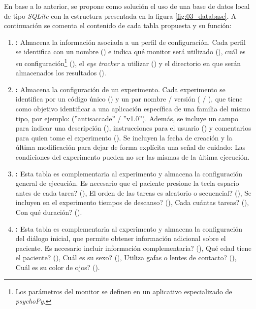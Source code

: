 \documentclass[\main/Main.tex]{subfiles}
\begin{document}
			En base a lo anterior, se propone como solución el uso de una base de datos local de tipo \textit{SQLite} con la estructura presentada en la figura \ref{fig:03_database}. A continuación se comenta el contenido de cada tabla propuesta y su función:
			\begin{enumerate}\setlength\itemsep{-0.5em}
				\item \textbf{:} Almacena la información asociada a un perfil de configuración. Cada perfil se identifica con un nombre () e indica qué monitor será utilizado (), cuál es su configuración\footnote{Los parámetros del monitor se definen en un aplicativo especializado de \textit{psychoPy}.} (), el \textit{eye tracker} a utilizar () y el directorio en que serán almacenados los resultados ().

				\item \textbf{:} Almacena la configuración de un experimento. Cada experimento se identifica por un código único () y un par nombre / versión ( / ), que tiene como objetivo identificar a una aplicación específica de una familia del mismo tipo, por ejemplo: (''antisaccade'' / ''v1.0''). Además, se incluye un campo para indicar una descripción (), instrucciones para el usuario () y comentarios para quien tome el experimento (). Se incluyen la fecha de creación y la última modificación para dejar de forma explícita una señal de cuidado: Las condiciones del experimento pueden no ser las mismas de la última ejecución.
				
				\item \textbf{:} Esta tabla es complementaria al experimento y almacena la configuración general de ejecución. \textquestiondown Es necesario que el paciente presione la tecla espacio antes de cada tarea? (), \textquestiondown El orden de las tareas es aleatorio o secuencial? (), \textquestiondown Se incluyen en el experimento tiempos de descanso? (), \textquestiondown Cada cuántas tareas? (), \textquestiondown Con qué duración? ().

				\item \textbf{:} Esta tabla es complementaria al experimento y almacena la configuración del diálogo inicial, que permite obtener información adicional sobre el paciente. \textquestiondown Es necesario incluir información complementaria? (), \textquestiondown Qué edad tiene el paciente? (), \textquestiondown Cuál es su sexo? (), \textquestiondown Utiliza gafas o lentes de contacto? (), \textquestiondown Cuál es su color de ojos? ().


\end{enumerate}
\end{document}
